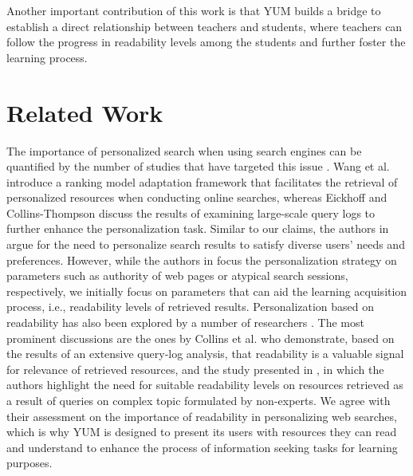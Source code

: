 \documentclass{sig-alternate-05-2015}
\begin{document}
Another important contribution of this work is that YUM builds a bridge to establish a direct relationship between teachers and students, where teachers can follow the progress in readability levels among the students and further foster the learning process.  

\section{Related Work}
The importance of personalized search when using search engines can be quantified by the number of studies that have targeted this issue \cite{Col11, Eic13, Jat12, Wan13}. Wang et al. \cite{Wan13} introduce a ranking model adaptation framework that facilitates the retrieval of personalized resources when conducting online searches, whereas Eickhoff and Collins-Thompson \cite{Eic13} discuss the results of examining large-scale query logs to further enhance the personalization task. Similar to our claims, the authors in \cite{Eic13, Wan13} argue for the need to personalize search results to satisfy diverse users' needs and preferences. However, while the authors in \cite{Eic13, Wan13} focus the personalization strategy on parameters such as authority of web pages or atypical search sessions, respectively, we initially focus on parameters that can aid the learning acquisition process, i.e., readability levels of retrieved results. Personalization based on readability has also been explored by a number of researchers \cite{Col11, Jat12}. The most prominent discussions are the ones by Collins et al. \cite{Col11} who demonstrate, based on the results of an extensive query-log analysis, that readability is a valuable signal for relevance of retrieved resources, and the study presented in \cite{Jat12}, in which the authors highlight the need for suitable readability levels on resources retrieved as a result of queries on complex topic formulated by non-experts. We agree with their assessment on the importance of readability in personalizing web searches, which is why YUM is designed to present its users with resources they can read and understand to enhance the process of information seeking tasks for learning purposes.
\end{document}
